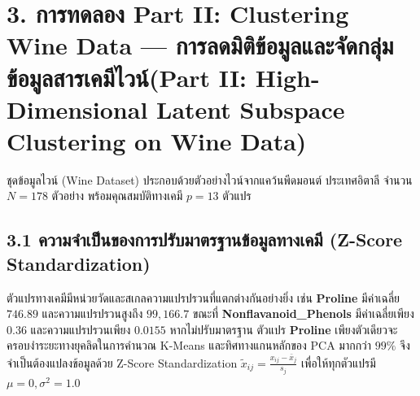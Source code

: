 \documentclass[12pt,a4paper]{article}
\newcommand{\codevar}[1]{\textcolor{codeaccent}{\textbf{#1}}}
\begin{document}
\begin{table}[H]
\centering
\small
{}
\caption{ตารางสรุปผลการประเมินเชิงตัวเลขและข้อจำกัดของอัลกอริทึม K-Means บนชุดข้อมูลสังเคราะห์ 4 รูปทรง}
\end{table}

\section*{3. การทดลอง \textcolor{partdarkorange}{Part II: Clustering Wine Data} — การลดมิติข้อมูลและจัดกลุ่มข้อมูลสารเคมีไวน์\newline \large(\textcolor{partdarkorange}{Part II: High-Dimensional Latent Subspace Clustering on Wine Data})}

ชุดข้อมูลไวน์ (Wine Dataset) ประกอบด้วยตัวอย่างไวน์จากแคว้นพีดมอนต์ ประเทศอิตาลี จำนวน $N=178$ ตัวอย่าง พร้อมคุณสมบัติทางเคมี $p=13$ ตัวแปร

\subsection*{3.1 ความจำเป็นของการปรับมาตรฐานข้อมูลทางเคมี (Z-Score Standardization)}
ตัวแปรทางเคมีมีหน่วยวัดและสเกลความแปรปรวนที่แตกต่างกันอย่างยิ่ง เช่น \codevar{Proline} มีค่าเฉลี่ย $746.89$ และความแปรปรวนสูงถึง $99,166.7$ ขณะที่ \codevar{Nonflavanoid\_Phenols} มีค่าเฉลี่ยเพียง $0.36$ และความแปรปรวนเพียง $0.0155$ หากไม่ปรับมาตรฐาน ตัวแปร \codevar{Proline} เพียงตัวเดียวจะครอบงำระยะทางยุคลิดในการคำนวณ K-Means และทิศทางแกนหลักของ PCA มากกว่า $99\%$ จึงจำเป็นต้องแปลงข้อมูลด้วย Z-Score Standardization $\tilde{x}_{ij} = \frac{x_{ij} - \bar{x}_j}{s_j}$ เพื่อให้ทุกตัวแปรมี $\mu=0, \sigma^2=1.0$
\end{document}
